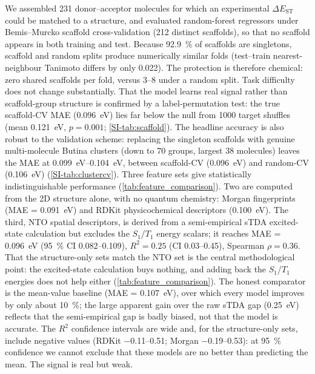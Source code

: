 We assembled \num{231} donor--acceptor molecules for which an experimental
$\Delta E_\text{ST}$ could be matched to a structure, and evaluated random-forest
regressors under Bemis--Murcko scaffold cross-validation (\num{212} distinct
scaffolds), so that no scaffold appears in both training and test.
Because \qty{92.9}{\percent} of scaffolds are singletons, scaffold and random splits
produce numerically similar folds (test--train nearest-neighbour Tanimoto differs by
only \num{0.022}). The protection is therefore chemical: zero shared scaffolds per
fold, versus \numrange{3}{8} under a random split. Task difficulty does not change
substantially. That the model learns real signal rather than
scaffold-group structure is confirmed by a label-permutation test: the true
scaffold-CV MAE (\qty{0.096}{\electronvolt}) lies far below the null from
\num{1000} target shuffles (mean \qty{0.121}{\electronvolt}, $p = 0.001$;
\cref{SI-tab:scaffold}).
The headline accuracy is also robust to the validation scheme: replacing the singleton
scaffolds with genuine multi-molecule Butina clusters (down to \num{70} groups, largest
\num{38} molecules) leaves the MAE at \qtyrange{0.099}{0.104}{\electronvolt}, between
scaffold-CV (\qty{0.096}{\electronvolt}) and random-CV (\qty{0.106}{\electronvolt})
(\cref{SI-tab:clustercv}).
Three feature sets give statistically indistinguishable performance
(\cref{tab:feature_comparison}). Two are computed from the 2D structure alone, with
no quantum chemistry: Morgan fingerprints (MAE = \qty{0.091}{\electronvolt}) and
RDKit physicochemical descriptors (\qty{0.100}{\electronvolt}). The third, NTO spatial
descriptors, is derived from a semi-empirical sTDA excited-state calculation but
excludes the $S_1$/$T_1$ energy scalars; it reaches MAE = \qty{0.096}{\electronvolt}
(\qty{95}{\percent} CI \numrange{0.082}{0.109}), $R^2 = 0.25$ (CI
\numrange{0.03}{0.45}), Spearman $\rho = 0.36$.
That the structure-only sets match the NTO set is the central methodological point:
the excited-state calculation buys nothing, and adding back the $S_1$/$T_1$ energies
does not help either (\cref{tab:feature_comparison}).
The honest comparator is the mean-value baseline (MAE = \qty{0.107}{\electronvolt}),
over which every model improves by only about \qty{10}{\percent}; the large apparent
gain over the raw sTDA gap (\qty{0.25}{\electronvolt}) reflects that the semi-empirical
gap is badly biased, not that the model is accurate.
The $R^2$ confidence intervals are wide and, for the structure-only sets, include
negative values (RDKit \numrange{-0.11}{0.51}; Morgan \numrange{-0.19}{0.53}): at
\qty{95}{\percent} confidence we cannot exclude that these models are no better than
predicting the mean. The signal is real but weak.

